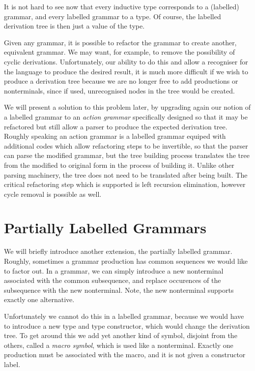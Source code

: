 \documentclass[oneside]{book}
\begin{document}
It is not hard to see now that every inductive type corresponds
to a (labelled) grammar, and every labelled grammar to a type.
Of course, the labelled derivation tree is then just a value
of the type.

Given any grammar, it is possible to refactor the grammar to
create another, equivalent grammar. We may want, for example,
to remove the possibility of cyclic derivations. Unfortunately,
our ability to do this and allow a recogniser for the language
to produce the desired result, it is much more difficult if
we wish to produce a derivation tree because we are no longer
free to add productions or nonterminals, since if used,
unrecognised nodes in the tree would be created.

We will present a solution to this problem later, by upgrading
again our notion of a labelled grammar to an {\em action grammar}
specifically designed so that it may be refactored but still
allow a parser to produce the expected derivation tree.
Roughly speaking an action grammar is a labelled grammar equiped
with additional codes which allow refactoring steps to be invertible,
so that the parser can parse the modified grammar, but the tree building
process translates the tree from the modified to original form in
the process of building it. Unlike other parsing machinery, the tree does
not need to be translated after being built. The critical refactoring
step which is supported is left recursion elimination, however cycle
removal is possible as well.

\section{Partially Labelled Grammars}
We will briefly introduce another extension, the partially
labelled grammar. Roughly, sometimes a grammar production
has common sequences we would like to factor out. In a grammar,
we can simply introduce a new nonterminal associated with
the common subsequence, and replace occurences of the subsequence
with the new nonterminal. Note, the new nonterminal supports
exactly one alternative.

Unfortunately we cannot do this in a labelled grammar,
because we would have to introduce a new type and type constructor,
which would change the derivation tree. To get around this we add
yet another kind of symbol, disjoint from the others, called
a {\em macro symbol}, which is used like a nonterminal.
Exactly one production must be associated with the macro,
and it is not given a constructor label.
\end{document}
